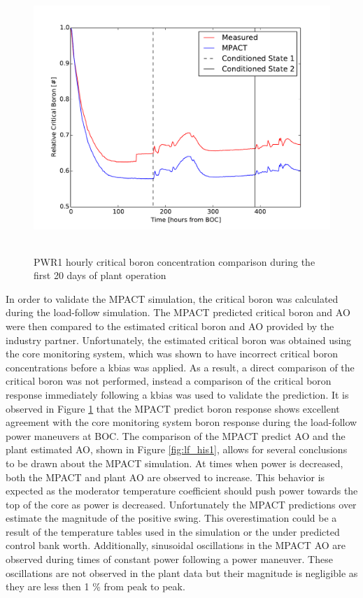 \documentclass[edeposit,fullpage,11pt]{uiucthesis2009}
\begin{document}
\begin{figure}[h]
\begin{center}
\includegraphics[height=4in]{./Figures/M_boron.pdf} 
\end{center}
\caption{PWR1 hourly critical boron concentration  comparison  during the first 20 days of plant operation}
\label{fig:lf_his2}
\end{figure}

In order to validate the MPACT simulation, the critical boron was calculated during the load-follow simulation. 
The MPACT predicted critical boron and \gls{AO} were then compared to the estimated critical boron and \gls{AO} provided by the industry partner.
Unfortunately, the estimated critical boron was obtained using the core monitoring system, which was shown to have incorrect critical boron concentrations before a kbias was applied. 
As a result, a direct comparison of the critical boron was not performed, instead a comparison of the critical boron response immediately following a kbias was used to validate the prediction.
It is observed in Figure \ref{fig:lf_his2} that the MPACT predict boron response shows excellent agreement with the core monitoring system boron response during the load-follow power maneuvers at \gls{BOC}.
The comparison of the MPACT predict \gls{AO} and the plant estimated \gls{AO}, shown in Figure \ref{fig:lf_his1}, allows for several conclusions to be drawn about the MPACT simulation.
At times when power is decreased, both the MPACT and plant \gls{AO} are observed to increase.
This behavior is expected as the moderator temperature coefficient should push power towards the top of the core as power is decreased.
Unfortunately the MPACT predictions over estimate the magnitude of the positive swing.
This overestimation could be a result of the temperature tables used in the simulation or the under predicted control bank worth.
Additionally, sinusoidal oscillations in the MPACT \gls{AO} are observed during times of constant power following a power maneuver.
These oscillations are not observed in the plant data but their magnitude is negligible as they are less then 1 \% from peak to peak.
  
\end{document}
